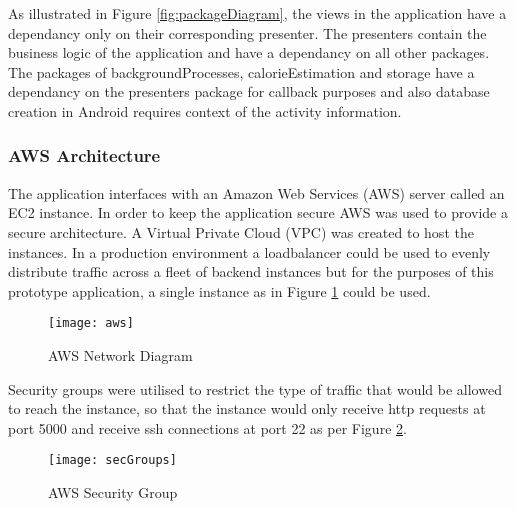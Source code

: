 As illustrated in Figure \ref{fig:packageDiagram}, the views in the application have a dependancy only on their corresponding presenter.
The presenters contain the business logic of the  application and have a dependancy on all other packages.
The packages of backgroundProcesses, calorieEstimation and storage have a dependancy on the presenters package for callback purposes and also database creation in Android requires context of the activity information.

\subsubsection*{AWS Architecture}
The application interfaces with an Amazon Web Services (AWS) server called an EC2 instance.
In order to keep the application secure AWS was used to provide a secure architecture.
A Virtual Private Cloud (VPC) was created to host the instances.
In a production environment a loadbalancer could be used to evenly distribute traffic across a fleet of backend instances but for the purposes of this prototype application, a single instance as in Figure \ref{fig:aws} could be used. 
\begin{figure}[h]
    \centering
    \texttt{[image: aws]}
    \caption{AWS Network Diagram}
    \label{fig:aws}
\end{figure}

Security groups were utilised to restrict the type of traffic that would be allowed to reach the instance, so that the instance would only receive http requests at port 5000 and receive ssh connections at port 22 as per Figure \ref{fig:awsSecGroup}.
\begin{figure}[h]
    \centering
    \texttt{[image: secGroups]}
    \caption{AWS Security Group}
    \label{fig:awsSecGroup}
\end{figure}


